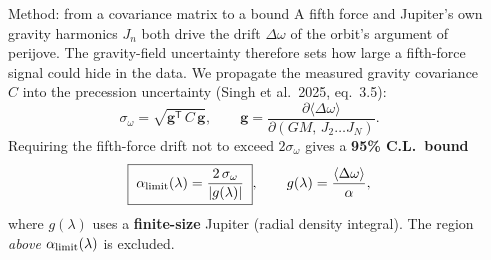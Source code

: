 \documentclass[final]{beamer}
\newlength{\colw}
\begin{document}
\begin{frame}[t]
\begin{columns}[t]
\begin{column}{\colw}
  \begin{block}{Method: from a covariance matrix to a bound}
    A fifth force and Jupiter's own gravity harmonics $J_n$ both drive the drift
    $\Delta\omega$ of the orbit's argument of perijove. The
    gravity-field uncertainty therefore sets how large a fifth-force signal could
    hide in the data. We propagate the measured gravity covariance $C$ into the
    precession uncertainty (Singh et al.\ 2025, eq.~3.5):
    \[
      \sigma_\omega=\sqrt{\mathbf{g}^{\mathsf T}\,C\,\mathbf{g}},
      \qquad
      \mathbf{g}=\frac{\partial\langle\Delta\omega\rangle}{\partial(GM,\,J_2\ldots J_N)}.
    \]
    Requiring the fifth-force drift not to exceed $2\sigma_\omega$ gives a
    \textbf{95\% C.L.\ bound}
    \[
      \boxed{\;\alpha_{\rm limit}(\lambda)=\dfrac{2\,\sigma_\omega}{|g(\lambda)|}\;},
      \qquad g(\lambda)=\frac{\langle\Delta\omega\rangle}{\alpha},
    \]
    where $g(\lambda)$ uses a \textbf{finite-size} Jupiter (radial density
    integral). The region \emph{above} $\alpha_{\rm limit}(\lambda)$ is excluded.
  \end{block}


\end{column}

\begin{column}{\colw}


\end{column}
\end{columns}
\end{frame}
\end{document}

